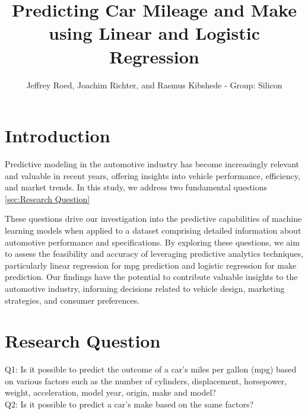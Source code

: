 \documentclass[a4paper, twocolumn]{article}
\author{Jeffrey Roed, Joachim Richter, and Rasmus Kibshede - Group: Silicon}
\title{Predicting Car Mileage and Make using Linear and Logistic Regression}
\begin{document}


\section{Introduction\label{sec:Introduction}}
Predictive modeling in the automotive industry has become increasingly relevant and valuable in recent years, offering insights into vehicle performance, efficiency, and market trends. In this study, we address two fundamental questions \ref{sec:Research Question}
 
These questions drive our investigation into the predictive capabilities of machine learning models when applied to a dataset comprising detailed information about automotive performance and specifications. By exploring these questions, we aim to assess the feasibility and accuracy of leveraging predictive analytics techniques, particularly linear regression for mpg prediction and logistic regression for make prediction. Our findings have the potential to contribute valuable insights to the automotive industry, informing decisions related to vehicle design, marketing strategies, and consumer preferences.

\section{Research Question\label{sec:Research Question}}
Q1: Is it possible to predict the outcome of a car's miles per gallon (mpg) based on various factors such as the number of cylinders, displacement, horsepower, weight, acceleration, model year, origin, make and model?\\
Q2: Is it possible to predict a car's make based on the same factors?
\end{document}

